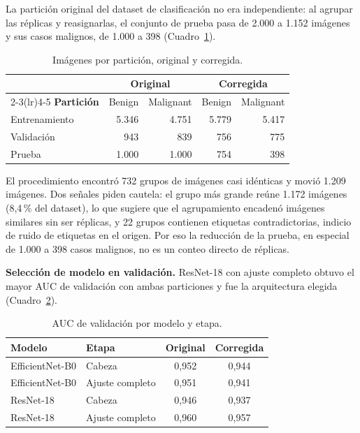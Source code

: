 \documentclass[conference]{IEEEtran}
\begin{document}
	La partición original del dataset de clasificación no era independiente: al agrupar las réplicas y reasignarlas, el conjunto de prueba pasa de 2.000 a 1.152 imágenes y sus casos malignos, de 1.000 a 398 (Cuadro~\ref{tab:particion}).
	
	\begin{table}[H]
		\centering
		\caption{Imágenes por partición, original y corregida.}
		\label{tab:particion}
		\begin{tabular}{@{}lrrrr@{}}
			\toprule
			& \multicolumn{2}{c}{\textbf{Original}} & \multicolumn{2}{c}{\textbf{Corregida}} \\
			\cmidrule(lr){2-3}\cmidrule(lr){4-5}
			\textbf{Partición} & Benign & Malignant & Benign & Malignant \\
			\midrule
			Entrenamiento & 5.346 & 4.751 & 5.779 & 5.417 \\
			Validación    & 943   & 839   & 756   & 775 \\
			Prueba        & 1.000 & 1.000 & 754   & 398 \\
			\bottomrule
		\end{tabular}
	\end{table}
	
	El procedimiento encontró 732 grupos de imágenes casi idénticas y movió 1.209 imágenes. Dos señales piden cautela: el grupo más grande reúne 1.172 imágenes (8,4\,\% del dataset), lo que sugiere que el agrupamiento encadenó imágenes similares sin ser réplicas, y 22 grupos contienen etiquetas contradictorias, indicio de ruido de etiquetas en el origen. Por eso la reducción de la prueba, en especial de 1.000 a 398 casos malignos, no es un conteo directo de réplicas.
	
	\textbf{Selección de modelo en validación.} ResNet-18 con ajuste completo obtuvo el mayor AUC de validación con ambas particiones y fue la arquitectura elegida (Cuadro~\ref{tab:val}).
	
	\begin{table}[H]
		\centering
		\caption{AUC de validación por modelo y etapa.}
		\label{tab:val}
		\begin{tabular}{@{}llcc@{}}
			\toprule
			\textbf{Modelo} & \textbf{Etapa} & \textbf{Original} & \textbf{Corregida} \\
			\midrule
			EfficientNet-B0 & Cabeza          & 0,952 & 0,944 \\
			EfficientNet-B0 & Ajuste completo & 0,951 & 0,941 \\
			ResNet-18       & Cabeza          & 0,946 & 0,937 \\
			ResNet-18       & Ajuste completo & 0,960 & 0,957 \\
			\bottomrule
		\end{tabular}
	\end{table}
	
\end{document}
